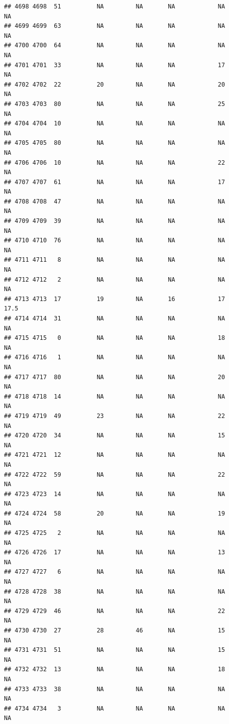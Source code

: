 \documentclass[man]{apa6}
\begin{document}
\begin{verbatim}
## 4698 4698  51          NA         NA       NA            NA       NA
## 4699 4699  63          NA         NA       NA            NA       NA
## 4700 4700  64          NA         NA       NA            NA       NA
## 4701 4701  33          NA         NA       NA            17       NA
## 4702 4702  22          20         NA       NA            20       NA
## 4703 4703  80          NA         NA       NA            25       NA
## 4704 4704  10          NA         NA       NA            NA       NA
## 4705 4705  80          NA         NA       NA            NA       NA
## 4706 4706  10          NA         NA       NA            22       NA
## 4707 4707  61          NA         NA       NA            17       NA
## 4708 4708  47          NA         NA       NA            NA       NA
## 4709 4709  39          NA         NA       NA            NA       NA
## 4710 4710  76          NA         NA       NA            NA       NA
## 4711 4711   8          NA         NA       NA            NA       NA
## 4712 4712   2          NA         NA       NA            NA       NA
## 4713 4713  17          19         NA       16            17     17.5
## 4714 4714  31          NA         NA       NA            NA       NA
## 4715 4715   0          NA         NA       NA            18       NA
## 4716 4716   1          NA         NA       NA            NA       NA
## 4717 4717  80          NA         NA       NA            20       NA
## 4718 4718  14          NA         NA       NA            NA       NA
## 4719 4719  49          23         NA       NA            22       NA
## 4720 4720  34          NA         NA       NA            15       NA
## 4721 4721  12          NA         NA       NA            NA       NA
## 4722 4722  59          NA         NA       NA            22       NA
## 4723 4723  14          NA         NA       NA            NA       NA
## 4724 4724  58          20         NA       NA            19       NA
## 4725 4725   2          NA         NA       NA            NA       NA
## 4726 4726  17          NA         NA       NA            13       NA
## 4727 4727   6          NA         NA       NA            NA       NA
## 4728 4728  38          NA         NA       NA            NA       NA
## 4729 4729  46          NA         NA       NA            22       NA
## 4730 4730  27          28         46       NA            15       NA
## 4731 4731  51          NA         NA       NA            15       NA
## 4732 4732  13          NA         NA       NA            18       NA
## 4733 4733  38          NA         NA       NA            NA       NA
## 4734 4734   3          NA         NA       NA            NA       NA

\end{verbatim}
\end{document}
